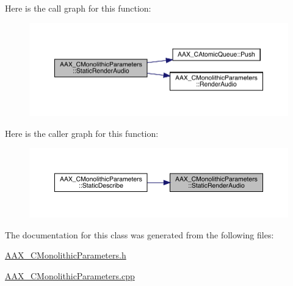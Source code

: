 Here is the call graph for this function\+:
\nopagebreak
\begin{figure}[H]
\begin{center}
\leavevmode
\includegraphics[width=350pt]{a01969_a0384cc1e3c40ca75ffbe76b89bd12c3c_cgraph}
\end{center}
\end{figure}
Here is the caller graph for this function\+:
\nopagebreak
\begin{figure}[H]
\begin{center}
\leavevmode
\includegraphics[width=350pt]{a01969_a0384cc1e3c40ca75ffbe76b89bd12c3c_icgraph}
\end{center}
\end{figure}


The documentation for this class was generated from the following files\+:\begin{DoxyCompactItemize}
\item 
\mbox{\hyperlink{a00746}{A\+A\+X\+\_\+\+C\+Monolithic\+Parameters.\+h}}\item 
\mbox{\hyperlink{a00743}{A\+A\+X\+\_\+\+C\+Monolithic\+Parameters.\+cpp}}\end{DoxyCompactItemize}
